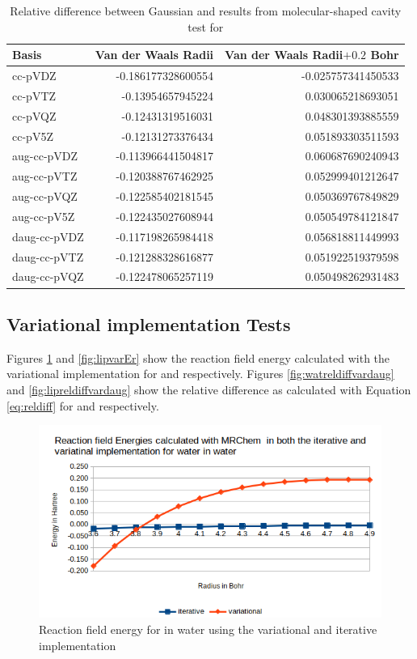 \documentclass[../master_thesis.tex]{subfiles}
\begin{document}
\begin{table}[htbp]
\caption[Relative difference between Gaussian and \mrchem results for ]{Relative difference between Gaussian and \mrchem results from molecular-shaped cavity  test for }
\begin{tabular}{l|r|r}
Basis & \multicolumn{1}{l|}{Van der Waals Radii} & \multicolumn{1}{l|}{Van der Waals Radii$+0.2$ Bohr} \\ \hline
cc-pVDZ & -0.186177328600554 & -0.025757341450533 \\
cc-pVTZ & -0.13954657945224 & 0.030065218693051 \\
cc-pVQZ & -0.12431319516031 & 0.048301393885559 \\
cc-pV5Z & -0.12131273376434 & 0.051893303511593 \\
aug-cc-pVDZ & -0.113966441504817 & 0.060687690240943 \\
aug-cc-pVTZ & -0.120388767462925 & 0.052999401212647 \\
aug-cc-pVQZ & -0.122585402181545 & 0.050369767849829 \\
aug-cc-pV5Z & -0.122435027608944 & 0.050549784121847 \\
daug-cc-pVDZ & -0.117198265984418 & 0.056818811449993 \\
daug-cc-pVTZ & -0.121288328616877 & 0.051922519379598 \\
daug-cc-pVQZ & -0.122478065257119 & 0.050498262931483 \\
\end{tabular}
\label{tab:acetamidabcreldiff}
\end{table}
\clearpage


\subsection{Variational implementation Tests}
Figures \ref{fig:watvarEr} and \ref{fig:lipvarEr} show the reaction field energy
calculated with the variational implementation for  and 
respectively. Figures \ref{fig:watreldiffvardaug} and \ref{fig:lipreldiffvardaug} show the
relative difference as calculated with Equation \ref{eq:reldiff} for  and 
respectively.

\begin{figure}[!htb]
  \centering
  \includegraphics[width=0.75\linewidth]{img/watvarEr.png}
  \caption{Reaction field energy for  in water using the variational and iterative implementation}
  \label{fig:watvarEr}
\end{figure}
\end{document}
